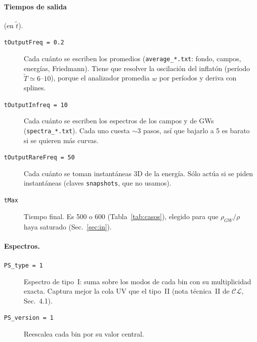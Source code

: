 \documentclass[11pt]{article}
\newcommand{\CosmoLattice}{\ensuremath{\mathcal{C}}\text{osmo}\ensuremath{\mathcal{L}}\text{attice}\xspace}
\begin{document}
            \paragraph{Tiempos de salida} (en $\tilde t$).
            \begin{description}
                \item[\texttt{tOutputFreq = 0.2}] Cada cuánto se escriben los promedios (\texttt{average\_*.txt}: fondo, campos, energías, Friedmann). Tiene que resolver la oscilación del inflatón (período $\tilde T \simeq 6$--$10$), porque el analizador promedia $w$ por períodos y deriva con splines.
                \item[\texttt{tOutputInfreq = 10}] Cada cuánto se escriben los espectros de los campos y de GWs (\texttt{spectra\_*.txt}). Cada uno cuesta $\sim 3$ pasos, así que bajarlo a 5 es barato si se quieren más curvas.
                \item[\texttt{tOutputRareFreq = 50}] Cada cuánto se toman instantáneas 3D de la energía. Sólo actúa si se piden instantáneas (claves \texttt{snapshots}, que no usamos).
                \item[\texttt{tMax}] Tiempo final. Es 500 o 600 (Tabla~\ref{tab:casos}), elegido para que $\rho_{GW}/\rho$ haya saturado (Sec.~\ref{sec:in}).
            \end{description}

            \paragraph{Espectros.}
            \begin{description}
                \item[\texttt{PS\_type = 1}] Espectro de tipo~I: suma sobre los modos de cada bin con su multiplicidad exacta. Captura mejor la cola UV que el tipo~II (nota técnica~II de \CosmoLattice, Sec.~4.1).
                \item[\texttt{PS\_version = 1}] Reescalea cada bin por su valor central.
            \end{description}
\end{document}
